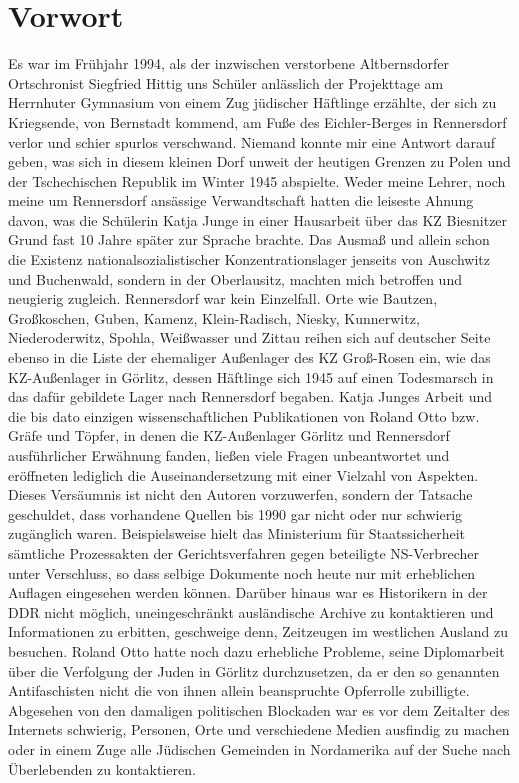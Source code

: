 \documentclass[a4paper,12pt,ngerman,
]{nisebook}
\begin{document}
\section*{Vorwort}
Es war im Frühjahr 1994, als der inzwischen verstorbene Altbernsdorfer Ortschronist Siegfried Hittig uns Schüler anlässlich der Projekttage am Herrnhuter Gymnasium von einem Zug jüdischer Häftlinge erzählte, der sich zu Kriegsende, von Bernstadt kommend, am Fuße des Eichler-Berges in Rennersdorf verlor und schier spurlos verschwand. 
Niemand konnte mir eine Antwort darauf geben, was sich in diesem kleinen Dorf unweit der heutigen Grenzen zu Polen und der Tschechischen Republik im Winter 1945 abspielte. Weder meine Lehrer, noch meine um Rennersdorf ansässige Verwandtschaft hatten die leiseste Ahnung davon, was die Schülerin Katja Junge in einer Hausarbeit über das KZ Biesnitzer Grund fast 10 Jahre später zur Sprache brachte. Das Ausmaß und allein schon die Existenz nationalsozialistischer Konzentrationslager jenseits von Auschwitz und Buchenwald, sondern in der Oberlausitz, machten mich betroffen und neugierig zugleich. Rennersdorf war kein Einzelfall. Orte wie Bautzen, Großkoschen, Guben, Kamenz, Klein-Radisch, Niesky, Kunnerwitz, Niederoderwitz, Spohla, Weißwasser und Zittau reihen sich auf deutscher Seite ebenso in die Liste der ehemaliger Außenlager des KZ Groß-Rosen ein, wie das KZ-Außenlager in Görlitz, dessen Häftlinge sich 1945 auf einen Todesmarsch in das dafür gebildete Lager nach Rennersdorf begaben. Katja Junges Arbeit und die bis dato einzigen wissenschaftlichen Publikationen von Roland Otto bzw. Gräfe und Töpfer, in denen die KZ-Außenlager Görlitz und Rennersdorf ausführlicher Erwähnung fanden, ließen viele Fragen unbeantwortet und eröffneten lediglich die Auseinandersetzung mit einer Vielzahl von Aspekten. Dieses Versäumnis ist nicht den Autoren vorzuwerfen, sondern der Tatsache geschuldet, dass vorhandene Quellen bis 1990 gar nicht oder nur schwierig zugänglich waren. Beispielsweise hielt das Ministerium für Staatssicherheit sämtliche Prozessakten der Gerichtsverfahren gegen beteiligte NS-Verbrecher unter Verschluss, so dass selbige Dokumente noch heute nur mit erheblichen Auflagen eingesehen werden können. Darüber hinaus war es Historikern in der DDR nicht möglich, uneingeschränkt ausländische Archive zu kontaktieren und Informationen zu erbitten, geschweige denn, Zeitzeugen im westlichen Ausland zu besuchen. Roland Otto hatte noch dazu erhebliche Probleme, seine Diplomarbeit über die Verfolgung der Juden in Görlitz durchzusetzen, da er den so genannten Antifaschisten nicht die von ihnen allein beanspruchte Opferrolle zubilligte. Abgesehen von den damaligen politischen Blockaden war es vor dem Zeitalter des Internets schwierig, Personen, Orte und verschiedene Medien ausfindig zu machen oder in einem Zuge alle Jüdischen Gemeinden in Nordamerika auf der Suche nach Überlebenden zu kontaktieren. 
\end{document}
